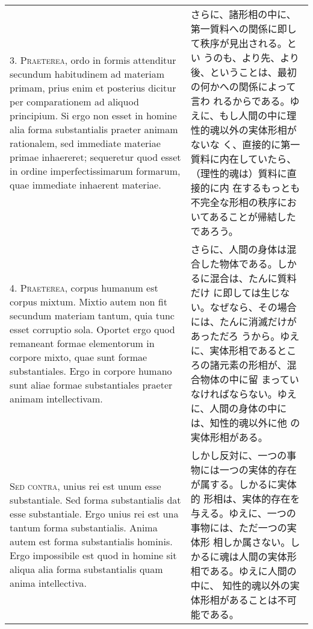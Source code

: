 \documentclass[paper=a4paper,fontsize=10pt,jafontsize=9pt,titlepage]{jlreq}
\begin{document}
\begin{longtable}{p{21em}p{21em}}
\\


3. {\scshape Praeterea}, ordo in formis attenditur secundum
habitudinem ad materiam primam, prius enim et posterius dicitur per
comparationem ad aliquod principium. Si ergo non esset in homine alia
forma substantialis praeter animam rationalem, sed immediate materiae
primae inhaereret; sequeretur quod esset in ordine imperfectissimarum
formarum, quae immediate inhaerent materiae.

&

 さらに、諸形相の中に、第一質料への関係に即して秩序が見出される。とい
 うのも、より先、より後、ということは、最初の何かへの関係によって言わ
 れるからである。ゆえに、もし人間の中に理性的魂以外の実体形相がないな
 く、直接的に第一質料に内在していたら、（理性的魂は）質料に直接的に内
 在するもっとも不完全な形相の秩序においてあることが帰結したであろう。

 
\\


4. {\scshape Praeterea}, corpus humanum est corpus mixtum. Mixtio
autem non fit secundum materiam tantum, quia tunc esset corruptio
sola. Oportet ergo quod remaneant formae elementorum in corpore mixto,
quae sunt formae substantiales. Ergo in corpore humano sunt aliae
formae substantiales praeter animam intellectivam.

&

さらに、人間の身体は混合した物体である。しかるに混合は、たんに質料だけ
に即しては生じない。なぜなら、その場合には、たんに消滅だけがあっただろ
うから。ゆえに、実体形相であるところの諸元素の形相が、混合物体の中に留
まっていなければならない。ゆえに、人間の身体の中には、知性的魂以外に他
の実体形相がある。
 
\\


{\scshape Sed contra}, unius rei est unum esse substantiale. Sed forma
substantialis dat esse substantiale. Ergo unius rei est una tantum
forma substantialis. Anima autem est forma substantialis hominis. Ergo
impossibile est quod in homine sit aliqua alia forma substantialis
quam anima intellectiva.

&

 しかし反対に、一つの事物には一つの実体的存在が属する。しかるに実体的
 形相は、実体的存在を与える。ゆえに、一つの事物には、ただ一つの実体形
 相しか属さない。しかるに魂は人間の実体形相である。ゆえに人間の中に、
 知性的魂以外の実体形相があることは不可能である。
 
\\



\end{longtable}
\end{document}
